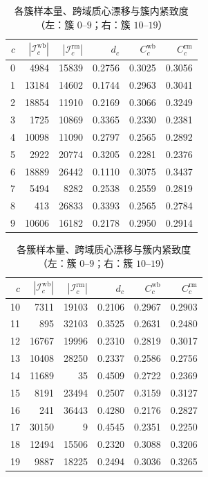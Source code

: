 \documentclass[withoutpreface]{cumcmthesis}
\newcommand{\tablesemismall}{\fontsize{11.5pt}{14pt}\selectfont}
\begin{document}
\begin{table}[htbp]
  \centering
  \caption{各簇样本量、跨域质心漂移与簇内紧致度（左：簇 $0$--$9$；右：簇 $10$--$19$）}
  \label{tab:cluster-metrics}
  {\tablesemismall
  \renewcommand{\arraystretch}{1.06}
  \begin{minipage}[t]{\dimexpr0.5\textwidth-0.28em\relax}
    \centering
    \begin{tabular}{@{}rrrrrr@{}}
      \toprule
      $c$ & $|\mathcal{I}^{\mathrm{wb}}_c|$ & $|\mathcal{I}^{\mathrm{rm}}_c|$ & $d_c$ & $C_c^{\mathrm{wb}}$ & $C_c^{\mathrm{rm}}$ \\
      \midrule
      0 & 4984 & 15839 & 0.2756 & 0.3025 & 0.3056 \\
      1 & 13184 & 14602 & 0.1744 & 0.2963 & 0.3041 \\
      2 & 18854 & 11910 & 0.2169 & 0.3066 & 0.3249 \\
      3 & 1725 & 10869 & 0.3365 & 0.2330 & 0.2381 \\
      4 & 10098 & 11090 & 0.2797 & 0.2565 & 0.2892 \\
      5 & 2922 & 20774 & 0.3205 & 0.2281 & 0.2376 \\
      6 & 18889 & 26442 & 0.1110 & 0.3075 & 0.3437 \\
      7 & 5494 & 8282 & 0.2538 & 0.2559 & 0.2819 \\
      8 & 413 & 26833 & 0.3393 & 0.2565 & 0.2784 \\
      9 & 10606 & 16182 & 0.2178 & 0.2950 & 0.2914 \\
      \bottomrule
    \end{tabular}
  \end{minipage}\hspace{0.55em}%
  \begin{minipage}[t]{\dimexpr0.5\textwidth-0.28em\relax}
    \centering
    \begin{tabular}{@{}rrrrrr@{}}
      \toprule
      $c$ & $|\mathcal{I}^{\mathrm{wb}}_c|$ & $|\mathcal{I}^{\mathrm{rm}}_c|$ & $d_c$ & $C_c^{\mathrm{wb}}$ & $C_c^{\mathrm{rm}}$ \\
      \midrule
      10 & 7311 & 19103 & 0.2106 & 0.2967 & 0.2903 \\
      11 & 895 & 32103 & 0.3525 & 0.2631 & 0.2480 \\
      12 & 16767 & 19996 & 0.2310 & 0.2819 & 0.3017 \\
      13 & 10408 & 28250 & 0.2337 & 0.2586 & 0.2756 \\
      14 & 11689 & 35 & 0.4509 & 0.2722 & 0.2369 \\
      15 & 8191 & 23494 & 0.2507 & 0.3159 & 0.3127 \\
      16 & 241 & 36443 & 0.4280 & 0.2176 & 0.2827 \\
      17 & 30150 & 9 & 0.4545 & 0.2351 & 0.2250 \\
      18 & 12494 & 15506 & 0.2320 & 0.3088 & 0.3206 \\
      19 & 9887 & 18225 & 0.2494 & 0.3036 & 0.3265 \\
      \bottomrule
    \end{tabular}
  \end{minipage}%
  }
\end{table}
\end{document}
